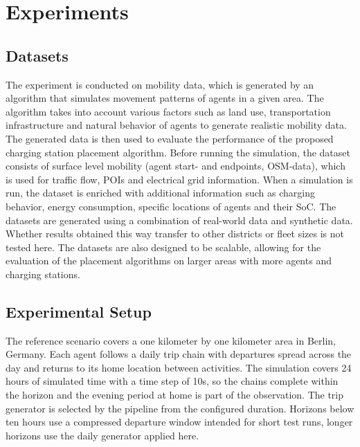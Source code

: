\section{Experiments}
\label{sec:experiments}

\subsection{Datasets}

The experiment is conducted on mobility data, which is generated by an algorithm that simulates movement patterns of agents in a given area. The algorithm takes into account various factors such as land use, transportation infrastructure and natural behavior of agents to generate realistic mobility data. The generated data is then used to evaluate the performance of the proposed charging station placement algorithm. Before running the simulation, the dataset consists of surface level mobility (agent start- and endpoints, OSM-data), which is used for traffic flow, \acp{POI} and electrical grid information. When a simulation is run, the dataset is enriched with additional information such as charging behavior, energy consumption, specific locations of agents and their \ac{SoC}. The datasets are generated using a combination of real-world data and synthetic data. Whether results obtained this way transfer to other districts or fleet sizes is not tested here. The datasets are also designed to be scalable, allowing for the evaluation of the placement algorithms on larger areas with more agents and charging stations.

\subsection{Experimental Setup}

The reference scenario covers a one kilometer by one kilometer area in Berlin, Germany. Each agent follows a daily trip chain with departures spread across the day and returns to its home location between activities. The simulation covers 24 hours of simulated time with a time step of 10s, so the chains complete within the horizon and the evening period at home is part of the observation. The trip generator is selected by the pipeline from the configured duration. Horizons below ten hours use a compressed departure window intended for short test runs, longer horizons use the daily generator applied here.

